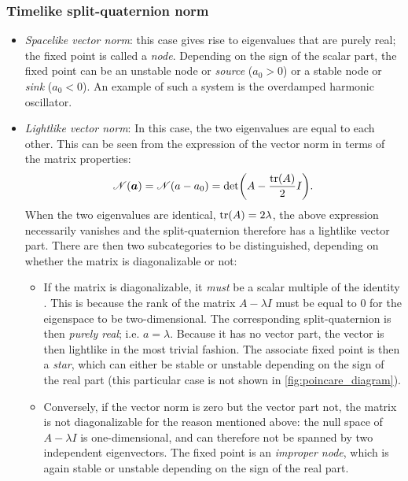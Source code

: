 \subsubsection*{Timelike split-quaternion norm}
    \begin{itemize}
        \item[\circled{4}] \emph{Spacelike vector norm}: this case gives rise to eigenvalues that are purely real; the fixed point is called a \emph{node}. Depending on the sign of the scalar part, the fixed point can be an unstable node or \emph{source} ($a_0 > 0$) or a stable node or \emph{sink} ($a_0 < 0$). An example of such a system is the overdamped harmonic oscillator.
        \item[\circled{5}] \emph{Lightlike vector norm}: In this case, the two eigenvalues are equal to each other. This can be seen from the expression of the vector norm in terms of the matrix properties: 
            $$ \mathscr{N}(\vec{a}) = \mathscr{N}(a - a_0) = \det(A - \frac{\trace(A)}{2}I). $$
        When the two eigenvalues are identical, $\trace(A) = 2\lambda$, the above expression necessarily vanishes and the split-quaternion therefore has a lightlike vector part. There are then two subcategories to be distinguished, depending on whether the matrix is diagonalizable or not:
        \begin{itemize}
            \item If the matrix is diagonalizable, it \emph{must} be a scalar multiple of the identity \cite{Edwards2018}. This is because the rank of the matrix $ A - \lambda I$ must be equal to 0 for the eigenspace to be two-dimensional. The corresponding split-quaternion is then \emph{purely real}; i.e. $a = \lambda$. Because it has no vector part, the vector is then lightlike in the most trivial fashion. The associate fixed point is then a \emph{star}, which can either be stable or unstable depending on the sign of the real part (this particular case is not shown in \cref{fig:poincare_diagram}). 
            \item Conversely, if the vector norm is zero but the vector part not, the matrix is not diagonalizable for the reason mentioned above: the null space of $ A - \lambda I$ is one-dimensional, and can therefore not be spanned by two independent eigenvectors. The fixed point is an \emph{improper node}, which is again stable or unstable depending on the sign of the real part.

\end{itemize}
\end{itemize}
